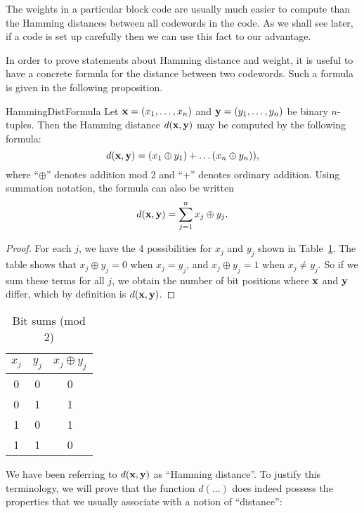 The weights in a particular block code are usually much easier to compute
than the Hamming distances between all codewords in the code. As we shall see later, if a
code is set up carefully then we can use this fact to our advantage.
 
In order to prove statements about Hamming distance and weight, it is useful to have a concrete formula for the distance between two codewords.  Such a formula is given in the following proposition.

\begin{prop}{HammingDistFormula}
Let ${\bold x} = (x_1, \ldots, x_n)$ and  ${\bold y} = (y_1, \ldots, y_n)$ be binary $n$-tuples. Then the Hamming distance $d({\bold x},{\bold y})$ may be computed by the following formula:
\[d({\bold x},{\bold y}) = (x_1\oplus y_1) + \ldots (x_n\oplus y_n) ), \]
where ``$\oplus$'' denotes addition mod 2 and ``+'' denotes ordinary addition. Using summation notation, the formula can also be written
\[d({\bold x},{\bold y}) = \sum_{j=1}^n x_j\oplus y_j.\]
\end{prop}

\begin{proof}
For each $j$, we have the 4 possibilities for $x_j$ and $y_j$ shown in Table~\ref{algcodes:table3}. The table shows that $x_j\oplus y_j = 0$ when $x_j = y_j$, and $x_j\oplus y_j = 1$ when $x_j \neq y_j$. So if we sum these terms for all $j$, we obtain the number of bit positions where ${\bold x}$ and ${\bold y}$ differ, which by definition is $d({\bold x},{\bold y})$.
\end{proof}

\begin{table}[htb]
\caption{Bit sums (mod 2)}{\small
\begin{center}
\begin{tabular}{c c c }
\hline
 $x_j$ & $y_j$ & $x_j \oplus y_j$\\  [0.5ex]
 \hline
0 & 0 & 0\\
0 & 1 & 1\\
1 & 0 & 1\\
1 & 1 & 0\\
\hline
\end{tabular}
\label{algcodes:table3}
\end{center}
}
\end{table}
 
We have been referring to $d( {\bold x}, {\bold y})$ as ``Hamming distance''. To justify this terminology, we will prove that the function $d(\ldots)$ does indeed possess the properties that we usually associate with a notion of ``distance'': 
 
